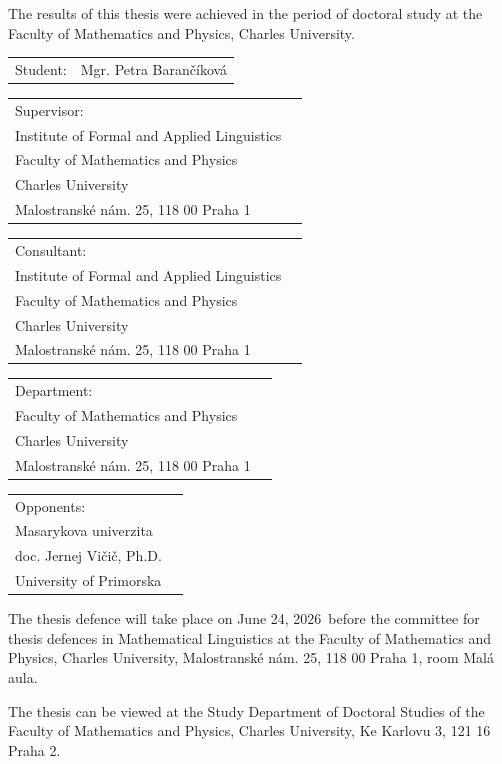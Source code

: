 \documentclass[12pt,a4paper]{report}
\makeatletter
\newcommand{\ThesisAuthor}{Mgr. Petra Barančíková}
\newcommand{\Department}{Institute of Formal and Applied Linguistics}
\newcommand{\Supervisor}{doc. RNDr. Markéta Lopatková, Ph.D.}
\newcommand{\Consultant}{prof. RNDr. Ondřej Bojar, Ph.D.}
\newcommand{\FacultyEN}{Faculty of Mathematics and Physics}
\newcommand{\UniversityEN}{Charles University}
\newcommand{\FacultyAddress}{Malostranské nám. 25, 118 00 Praha 1}
\newcommand{\StudyDepartmentAddress}{Ke Karlovu 3, 121 16 Praha 2}
\newcommand{\DefenceDateEN}{June 24, 2026}
\newcommand{\DefenceRoom}{Malá aula}
\newenvironment{detailpage}{%
  \thispagestyle{empty}%
  \vspace*{12mm}%
  \small
  \setlength{\parskip}{0.3em}%
  \setlength{\parindent}{0pt}%
}{%
}
\newcommand{\detailrow}[2]{%
  \noindent\begin{tabular}{@{}p{35mm}@{\hspace{3mm}}p{102mm}@{}}%
    #1 & \begin{minipage}[t]{102mm}#2\end{minipage}
  \end{tabular}\par%
}
\makeatother
\begin{document}
\begin{detailpage}
The results of this thesis were achieved in the period of doctoral study at the \FacultyEN, \UniversityEN.

\vspace{1.2em}
\detailrow{Student:}{\ThesisAuthor}
\detailrow{Supervisor:}{\Supervisor\\\Department\\\FacultyEN\\\UniversityEN\\\FacultyAddress}
\detailrow{Consultant:}{\Consultant\\\Department\\\FacultyEN\\\UniversityEN\\\FacultyAddress}

\vspace{0.7em}
\detailrow{Department:}{\Department\\\FacultyEN\\\UniversityEN\\\FacultyAddress}

\vspace{0.7em}
\detailrow{Opponents:}{doc. Mgr. Pavel Rychlý, Ph.D.\\Masarykova univerzita\\[0.4em]doc. Jernej Vičič, Ph.D.\\University of Primorska}

\vspace{1.2em}
The thesis defence will take place on \DefenceDateEN\ before the committee for thesis defences in Mathematical Linguistics at the \FacultyEN, \UniversityEN, \FacultyAddress, room \DefenceRoom.

\vspace{1.2em}
The thesis can be viewed at the Study Department of Doctoral Studies of the \FacultyEN, \UniversityEN, \StudyDepartmentAddress.
\end{detailpage}

\newpage
\end{document}
